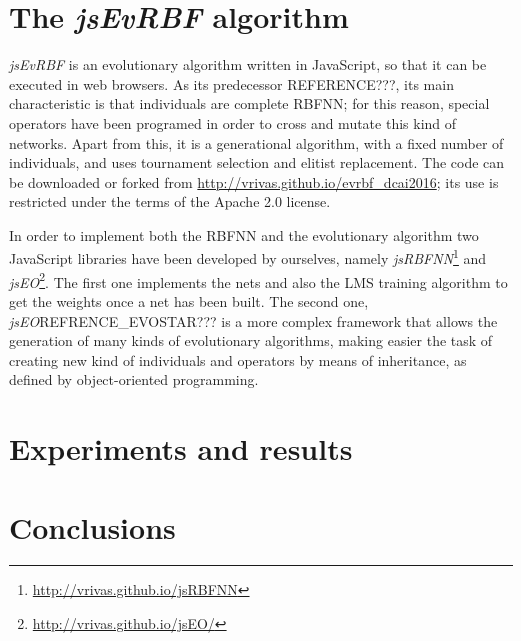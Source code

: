 \documentclass{llncs}
\begin{document}
\section{The {\em jsEvRBF} algorithm}
\label{sec:algorithm}
{\em jsEvRBF} is an evolutionary algorithm written in JavaScript, so that it can be executed in web browsers.  As its predecessor REFERENCE???, its main characteristic is that individuals are complete RBFNN; for this reason, special operators have been programed in order to cross and mutate this kind of networks. Apart from this, it is a generational algorithm, with a fixed number of individuals, and uses tournament selection and elitist replacement. The code can be downloaded or forked from \url{ http://vrivas.github.io/evrbf_dcai2016}; its use is restricted under the terms of the Apache 2.0 license.

In order to implement both the RBFNN and the evolutionary algorithm two JavaScript libraries have been developed by ourselves, namely {\em jsRBFNN}\footnote{\url{http://vrivas.github.io/jsRBFNN}} and {\em jsEO}\footnote{\url{http://vrivas.github.io/jsEO/}}. The first one implements the nets and also the LMS training algorithm to get the weights once a net has been built. The second one, {\em jsEO}REFRENCE_EVOSTAR??? is a more complex framework that allows the generation of many kinds of evolutionary algorithms, making easier the task of creating new kind of individuals and operators by means of inheritance, as defined by object-oriented programming.





\section{Experiments and results}
\label{sec:experiments}
\section{Conclusions}
\label{sec:conclusions}
\end{document}
